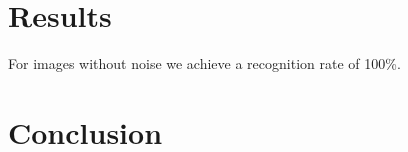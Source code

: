 \documentclass[conference]{IEEEtran}
\begin{document}
\section{Results}

For images without noise we achieve a recognition rate of 100\%. 

\section{Conclusion}

\label{sec:results}

%
%



%
%
\end{document}
